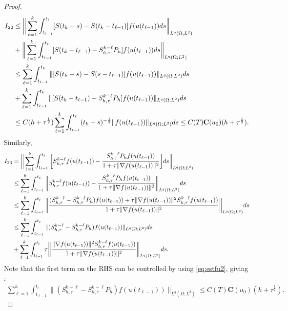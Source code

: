 \documentclass[reqno, 11pt]{amsart}
\theoremstyle{plain}
\theoremstyle{definition}
\theoremstyle{remark}
\numberwithin{equation}{section}
\numberwithin{theorem}{section}
\newcommand{\con}{\mathbf{C}}
\begin{document}
{\begin{proof}
\begin{align}
I_{22}&\leq \bigg\|\sum\limits_{\ell=1}^k\int_{t_{\ell-1}}^{t_\ell}[S(t_k-s)-S(t_k-t_{\ell-1})]f(u(t_{\ell-1}))ds\bigg\|_{L^q(\Omega;L^2)}\notag\\
&+\bigg\|\sum\limits_{\ell=1}^k\int_{t_{\ell-1}}^{t_\ell}[S(t_k-t_{\ell-1})-S_{h,\tau}^{k-\ell}P_h]f(u(t_{\ell-1}))ds\bigg\|_{L^q(\Omega;L^2)}\notag\\
&\leq \sum\limits_{\ell=1}^k\int_{t_{\ell-1}}^{t_k} \|[S(t_k-s)-S(s-t_{\ell-1})]f(u(t_{\ell-1}))\|_{L^q(\Omega;L^2)}ds\notag\\
&+ \sum\limits_{\ell=1}^k\int_{t_{\ell-1}}^{t_k} \|[S(t_k-t_{\ell-1})-S_{h,\tau}^{k-\ell}P_h]f(u(t_{\ell-1}))\|_{L^q(\Omega;L^2)} ds\notag\\
&\leq C(h+\tau^{\frac{1}{2}}) \sum\limits_{\ell=1}^k\int_{t_{\ell-1}}^{t_\ell} (t_k-s)^{-\frac{1}{2}} \|f(u(t_{\ell-1}))\|_{L^q(\Omega;L^2)}ds
\leq C(T) \con(u_0)(h+\tau^{\frac{1}{2}}). \label{eq:I22}
\end{align}
Similarly,  
\begin{align}
I_{23}&= \bigg\|\sum\limits_{\ell=1}^k\int_{t_{\ell-1}}^{t_\ell}\bigg[S_{h,\tau}^{k-\ell}f(u(t_{\ell-1}))-\frac{S_{h,\tau}^{k-\ell}P_hf(u(t_{\ell-1}))}{1+\tau\|\nabla f(u(t_{\ell-1}))\|^2}\bigg]ds\bigg\|_{L^q(\Omega;L^2)}\notag\\
&\leq \sum\limits_{\ell=1}^k\int_{t_{\ell-1}}^{t_\ell}\bigg\|S_{h,\tau}^{k-\ell}f(u(t_{\ell-1}))-\frac{S_{h,\tau}^{k-\ell}P_hf(u(t_{\ell-1}))}{1+\tau\|\nabla f(u(t_{\ell-1}))\|^2}\bigg\|_{L^q(\Omega;L^2)}ds\notag\\
&\leq \sum\limits_{\ell=1}^k\int_{t_{\ell-1}}^{t_\ell} \bigg\|\frac{(S_{h,\tau}^{k-\ell}-S_{h,\tau}^{k-\ell}P_h)f(u(t_{\ell-1}))
+\tau\|\nabla f(u(t_{\ell-1}))\|^2 S_{h,\tau}^{k-\ell}f(u(t_{\ell-1}))}{1+\tau\|\nabla f(u(t_{\ell-1}))\|^2}\bigg\|_{L^q(\Omega;L^2)}ds\notag\\
&\leq \sum\limits_{\ell=1}^k\int_{t_{\ell-1}}^{t_\ell} \|(S_{h,\tau}^{k-\ell}-S_{h,\tau}^{k-\ell}P_h)f(u(t_{\ell-1}))\|_{L^q(\Omega;L^2)}ds\notag\\
&+\sum\limits_{\ell=1}^k\int_{t_{\ell-1}}^{t_\ell}  \tau \bigg\|\frac{\|\nabla f(u(t_{\ell-1}))\|^2 S_{h,\tau}^{k-\ell}f(u(t_{\ell-1}))}{1+\tau\|\nabla f(u(t_{\ell-1}))\|^2}\bigg\|_{L^q(\Omega;L^2)}ds.
\end{align}
Note that the first term on the RHS can be controlled by using \eqref{eq:estfu2}, giving :
\begin{align}\label{eq:I231}
\sum\limits_{\ell=1}^k\int_{t_{\ell-1}}^{t_\ell} \|(S_{h,\tau}^{k-\ell}-S_{h,\tau}^{k-\ell}P_h)f(u(t_{\ell-1}))\|_{L^q(\Omega;L^2)}\leq C(T)\con(u_0)(h+\tau^{\frac{1}{2}}).

\end{align}
\end{proof}}
\end{document}
